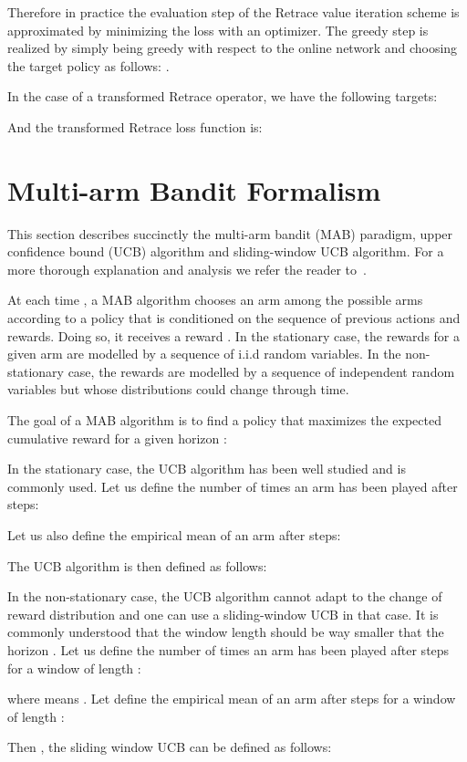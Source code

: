 \documentclass{article}
\begin{document}
Therefore in practice the evaluation step of the Retrace value iteration scheme  is approximated by minimizing the loss  with an optimizer. The greedy step  is realized by simply being greedy with respect to the online network and choosing the target policy as follows: .

In the case of a transformed Retrace operator, we have  the following targets:


And the transformed Retrace loss function is:
 \section{Multi-arm Bandit Formalism}
\label{app:bandits}
This section describes succinctly the multi-arm bandit (MAB) paradigm, upper confidence bound (UCB) algorithm and sliding-window UCB algorithm. For a more thorough explanation and analysis we refer the reader to~\citet{garivier2008upperconfidence}. 

At each time , a MAB algorithm chooses an arm  among the possible arms  according to a policy  that is conditioned on the sequence of previous actions and rewards. Doing so, it receives a reward  . In the stationary case, the rewards  for a given arm  are modelled by a sequence of i.i.d random variables. In the non-stationary case, the rewards  are modelled by a sequence of independent random variables but whose distributions could change through time.

The goal of a MAB algorithm is to find a policy  that maximizes the expected cumulative reward for a given horizon :


In the stationary case, the UCB algorithm has been well studied and is commonly used. Let us define the number of times an arm  has been played after  steps:

Let us also define the empirical mean of an arm  after  steps:


The UCB algorithm is then defined as follows:


In the non-stationary case, the UCB algorithm cannot adapt to the change of reward distribution and one can use a sliding-window UCB in that case. It is commonly understood that the window length  should be way smaller that the horizon .
Let us define the number of times an arm  has been played after  steps for a window of length :

where  means . Let define the empirical mean of an arm  after  steps for a window of length :


Then , the sliding window UCB can be defined as follows:
\end{document}
